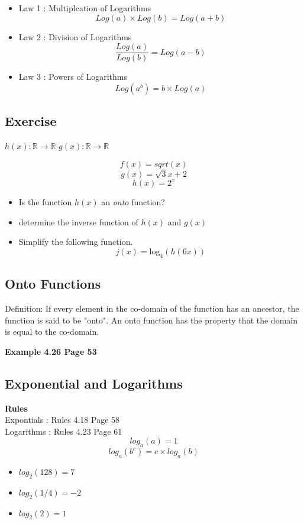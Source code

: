 \documentclass[a4paper,12pt]{article}
\begin{document}
\begin{itemize}
\item Law 1 : Multiplcation of Logarithms
\[ Log(a) \times Log(b) = Log(a+b) \]
\item Law 2 : Division of Logarithms
\[ \frac{Log(a)}{Log(b)} = Log(a-b) \]
\item Law 3 : Powers of Logarithms
\[ Log(a^b) = b \times Log(a) \]
\end{itemize}



\subsection{Exercise} 
$h(x): \mathbb{R} \rightarrow \mathbb{R}$ 
$g(x): \mathbb{R} \rightarrow \mathbb{R}$

\[f(x) = sqrt(x)\]
\[g(x) = \sqrt{3}{x+2}\]
\[h(x) = 2^x\]

\begin{itemize}
\item Is the function $h(x)$ an \textit{onto} function?
\item determine the inverse function of $h(x)$ and $g(x)$
\item Simplify the following function.
\[ j(x) = \mbox{log}_4(h(6x))\]
\end{itemize}
\subsection{Onto Functions}
Definition: If every element in the co-domain of the function has an ancestor, the function is said to be "onto".
An onto function has the property that the domain is equal to the co-domain.


\textbf{Example 4.26 Page 53}

\subsection*{Exponential and Logarithms}

\textbf{Rules}\\
Expontials : Rules 4.18 Page 58 \\
Logarithms : Rules 4.23 Page 61 \\

\[ log_a(a) = 1 \]
\[ log_a(b^c) = c \times log_a(b) \]

\begin{itemize}
\item $log_2(128) = 7$
\item $log_2(1/4) = -2$
\item $log_2(2) = 1$
\end{itemize}
\end{document}
